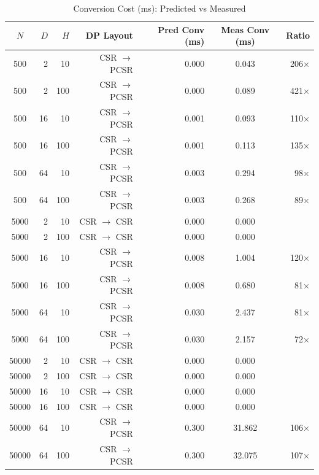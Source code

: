 \begin{table}[t]
\centering
\caption{Conversion Cost (ms): Predicted vs Measured}
\label{tab:conv-cost}
\begin{tabular}{crrrrcr}
\toprule
$N$ & $D$ & $H$ & DP Layout & Pred Conv (ms) & Meas Conv (ms) & Ratio \\
\midrule
   500 &   2 &   10 & CSR $\rightarrow$ PCSR &         0.000 &         0.043 &   206$\times$ \\
   500 &   2 &  100 & CSR $\rightarrow$ PCSR &         0.000 &         0.089 &   421$\times$ \\
   500 &  16 &   10 & CSR $\rightarrow$ PCSR &         0.001 &         0.093 &   110$\times$ \\
   500 &  16 &  100 & CSR $\rightarrow$ PCSR &         0.001 &         0.113 &   135$\times$ \\
   500 &  64 &   10 & CSR $\rightarrow$ PCSR &         0.003 &         0.294 &    98$\times$ \\
   500 &  64 &  100 & CSR $\rightarrow$ PCSR &         0.003 &         0.268 &    89$\times$ \\
  5000 &   2 &   10 & CSR $\rightarrow$ CSR &         0.000 &         0.000 &       \\
  5000 &   2 &  100 & CSR $\rightarrow$ CSR &         0.000 &         0.000 &       \\
  5000 &  16 &   10 & CSR $\rightarrow$ PCSR &         0.008 &         1.004 &   120$\times$ \\
  5000 &  16 &  100 & CSR $\rightarrow$ PCSR &         0.008 &         0.680 &    81$\times$ \\
  5000 &  64 &   10 & CSR $\rightarrow$ PCSR &         0.030 &         2.437 &    81$\times$ \\
  5000 &  64 &  100 & CSR $\rightarrow$ PCSR &         0.030 &         2.157 &    72$\times$ \\
 50000 &   2 &   10 & CSR $\rightarrow$ CSR &         0.000 &         0.000 &       \\
 50000 &   2 &  100 & CSR $\rightarrow$ CSR &         0.000 &         0.000 &       \\
 50000 &  16 &   10 & CSR $\rightarrow$ CSR &         0.000 &         0.000 &       \\
 50000 &  16 &  100 & CSR $\rightarrow$ CSR &         0.000 &         0.000 &       \\
 50000 &  64 &   10 & CSR $\rightarrow$ PCSR &         0.300 &        31.862 &   106$\times$ \\
 50000 &  64 &  100 & CSR $\rightarrow$ PCSR &         0.300 &        32.075 &   107$\times$ \\
\bottomrule
\end{tabular}
\end{table}

